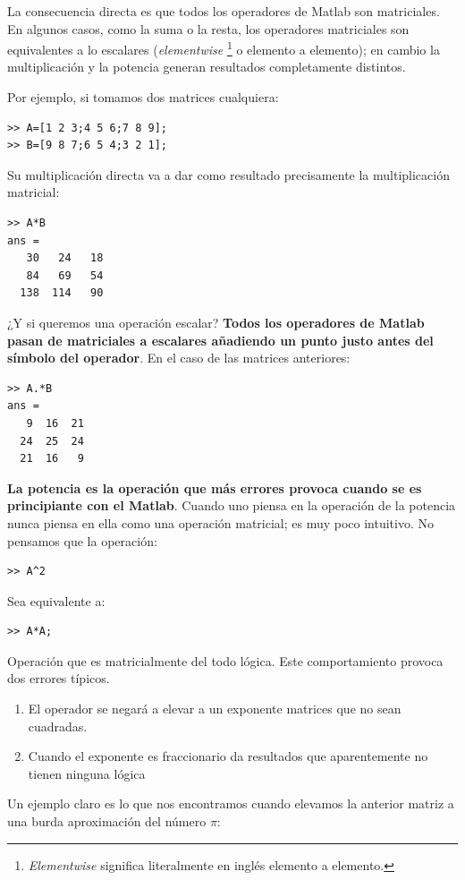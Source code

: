 La consecuencia directa es que todos los operadores de Matlab son
matriciales. En algunos casos, como la suma o la resta, los operadores
matriciales son equivalentes a lo escalares (\emph{elementwise}%
\footnote{\emph{Elementwise} significa literalmente en inglés elemento
  a elemento.%
} o elemento a elemento); en cambio la multiplicación y la potencia
generan resultados completamente distintos.

Por ejemplo, si tomamos dos matrices cualquiera:

\begin{lstlisting}
>> A=[1 2 3;4 5 6;7 8 9];
>> B=[9 8 7;6 5 4;3 2 1];
\end{lstlisting}

Su multiplicación directa va a dar como resultado precisamente la
multiplicación matricial:

\begin{lstlisting}
>> A*B
ans =
   30   24   18
   84   69   54
  138  114   90
\end{lstlisting}
¿Y si queremos una operación escalar? \textbf{Todos los operadores de
  Matlab pasan de matriciales a escalares añadiendo un punto justo
  antes del símbolo del operador}. En el caso de las matrices
anteriores:

\begin{lstlisting}
>> A.*B
ans =
   9  16  21
  24  25  24
  21  16   9
\end{lstlisting}
\textbf{La potencia es la operación que más errores provoca cuando se
  es principiante con el Matlab}. Cuando uno piensa en la operación de
la potencia nunca piensa en ella como una operación matricial; es muy
poco intuitivo. No pensamos que la operación:

\begin{lstlisting}
>> A^2
\end{lstlisting}
Sea equivalente a:

\begin{lstlisting}
>> A*A;
\end{lstlisting}

Operación que es matricialmente del todo lógica. Este comportamiento
provoca dos errores típicos.

\begin{enumerate}
\item El operador se negará a elevar a un exponente matrices que no
  sean cuadradas.
\item Cuando el exponente es fraccionario da resultados que
  aparentemente no tienen ninguna lógica
\end{enumerate}
Un ejemplo claro es lo que nos encontramos cuando elevamos la anterior
matriz a una burda aproximación del número $\pi$:

